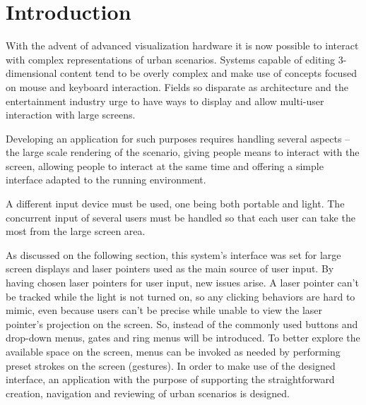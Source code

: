 \chapter{Introduction}






With the advent of advanced visualization hardware it is now possible
to interact with complex representations of urban scenarios.
Systems capable of editing 3-dimensional content
tend to be overly complex and make use of concepts
focused on mouse and keyboard interaction.
Fields so disparate as architecture and the entertainment industry
urge to have ways to display and allow multi-user interaction with large screens.



Developing an application for such purposes requires handling several aspects
-- the large scale rendering of the scenario,
giving people means to interact with the screen,
allowing people to interact at the same time and
offering a simple interface adapted to the running environment.



A different input device must be used, one being both portable and light.
The concurrent input of several users must be handled so that each user can
take the most from the large screen area.

As discussed on the following section, this system's interface was set
for large screen displays and laser pointers used as the main source of user input.
By having chosen laser pointers for user input, new issues arise.
A laser pointer can't be tracked while the light is not turned on,
so any clicking behaviors are hard to mimic, even because users can't be 
precise while unable to view the laser pointer's projection on the screen.
So, instead of the commonly used buttons and drop-down menus,
gates and ring menus will be introduced.
To better explore the available space on the screen,
menus can be invoked as needed by performing preset strokes on the screen (gestures).
In order to make use of the designed interface, an application with the
purpose of supporting the straightforward creation, navigation and reviewing of urban scenarios is designed.


